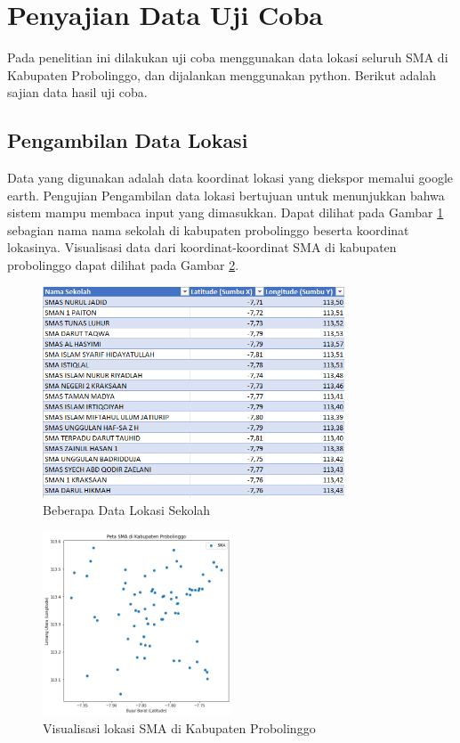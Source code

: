 \section{Penyajian Data Uji Coba}

Pada penelitian ini dilakukan uji coba menggunakan data lokasi seluruh SMA di Kabupaten Probolinggo, dan dijalankan menggunakan python. Berikut adalah sajian data hasil uji coba.

\subsection{Pengambilan Data Lokasi}

Data yang digunakan adalah data koordinat lokasi yang diekspor memalui google earth. Pengujian Pengambilan data lokasi bertujuan untuk menunjukkan bahwa sistem 
mampu membaca input yang dimasukkan. Dapat dilihat pada Gambar \ref{fig:datalok} sebagian nama nama sekolah di kabupaten probolinggo beserta koordinat lokasinya. Visualisasi data dari koordinat-koordinat SMA di kabupaten probolinggo dapat dilihat pada Gambar \ref{fig:petasma}.

\begin{figure}[h!]
  \centering
  \includegraphics[width=0.8\textwidth]{data lokasi sekolah.png}
  \caption{Beberapa Data Lokasi Sekolah}
  \label{fig:datalok}
\end{figure}

\begin{figure}[h!]
  \centering
  \includegraphics[width=0.5\textwidth]{peta sma.png}
  \caption{Visualisasi lokasi SMA di Kabupaten Probolinggo}
  \label{fig:petasma}
\end{figure}

